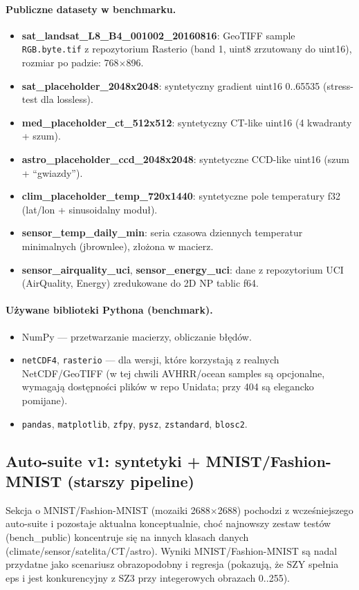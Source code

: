 \documentclass[11pt,a4paper]{article}
\begin{document}
\paragraph{Publiczne datasety w benchmarku.}
\begin{itemize}
  \item \textbf{sat\_landsat\_L8\_B4\_001002\_20160816}:
        GeoTIFF sample \texttt{RGB.byte.tif} z repozytorium Rasterio (band 1, uint8 zrzutowany do uint16),
        rozmiar po padzie: 768$\times$896.
  \item \textbf{sat\_placeholder\_2048x2048}:
        syntetyczny gradient uint16 0..65535 (stress-test dla lossless).
  \item \textbf{med\_placeholder\_ct\_512x512}:
        syntetyczny CT-like uint16 (4 kwadranty + szum).
  \item \textbf{astro\_placeholder\_ccd\_2048x2048}:
        syntetyczne CCD-like uint16 (szum + ``gwiazdy'').
  \item \textbf{clim\_placeholder\_temp\_720x1440}:
        syntetyczne pole temperatury f32 (lat/lon + sinusoidalny moduł).
  \item \textbf{sensor\_temp\_daily\_min}:
        seria czasowa dziennych temperatur minimalnych (jbrownlee), złożona w macierz.
  \item \textbf{sensor\_airquality\_uci}, \textbf{sensor\_energy\_uci}:
        dane z repozytorium UCI (AirQuality, Energy) zredukowane do 2D NP tablic f64.
\end{itemize}

\paragraph{Używane biblioteki Pythona (benchmark).}
\begin{itemize}
  \item NumPy --- przetwarzanie macierzy, obliczanie błędów.
  \item \texttt{netCDF4}, \texttt{rasterio} --- dla wersji, które korzystają z realnych NetCDF/GeoTIFF (w tej chwili AVHRR/ocean samples są opcjonalne, wymagają dostępności plików w repo Unidata; przy 404 są elegancko pomijane).
  \item \texttt{pandas}, \texttt{matplotlib}, \texttt{zfpy}, \texttt{pysz}, \texttt{zstandard}, \texttt{blosc2}.
\end{itemize}

\subsection{Auto-suite v1: syntetyki + MNIST/Fashion-MNIST (starszy pipeline)}
Sekcja o MNIST/Fashion-MNIST (mozaiki 2688$\times$2688) pochodzi z wcześniejszego auto-suite i pozostaje aktualna konceptualnie, choć najnowszy zestaw testów (bench\_public) koncentruje się na innych klasach danych (climate/sensor/satelita/CT/astro). Wyniki MNIST/Fashion-MNIST są nadal przydatne jako scenariusz obrazopodobny i regresja (pokazują, że SZY spełnia eps i jest konkurencyjny z SZ3 przy integerowych obrazach 0..255).
\end{document}
